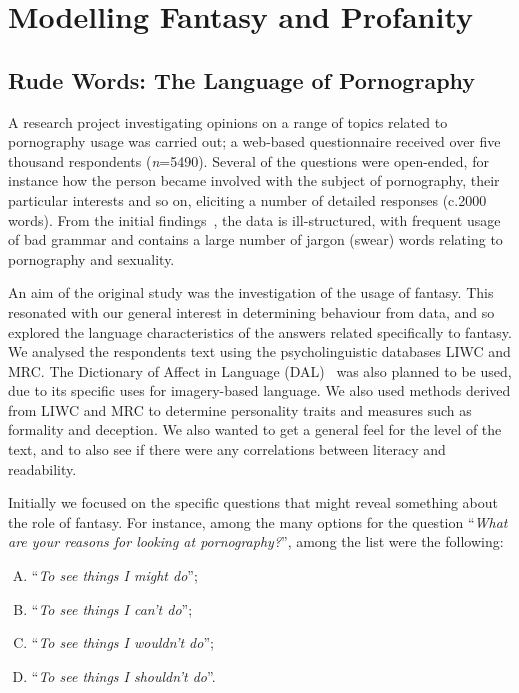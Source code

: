 \documentclass{AISB2008}
\begin{document}
\section{Modelling Fantasy and Profanity}

\subsection{Rude Words: The Language of Pornography}

A research project investigating opinions on a range of topics related
to pornography usage was carried out; a web-based questionnaire
received over five thousand respondents ({\emph{n}}=5490). Several of
the questions were open-ended, for instance how the person became
involved with the subject of pornography, their particular interests
and so on, eliciting a number of detailed responses (c.2000
words). From the initial findings~\cite{smith-et-al:2013}, the data is
ill-structured, with frequent usage of bad grammar and contains a
large number of jargon (swear) words relating to pornography and
sexuality.

An aim of the original study was the investigation of the usage of
fantasy. This resonated with our general interest in determining
behaviour from data, and so explored the language characteristics of
the answers related specifically to fantasy. We analysed the
respondents text using the psycholinguistic databases LIWC and
MRC. The Dictionary of Affect in Language
(DAL)~\cite{sweeney+whissell:1984} was also planned to be used, due to
its specific uses for imagery-based language. We also used methods
derived from LIWC and MRC to determine personality traits and measures
such as formality and deception. We also wanted to get a general feel
for the level of the text, and to also see if there were any
correlations between literacy and readability.

Initially we focused on the specific questions that might reveal
something about the role of fantasy. For instance, among the many
options for the question ``{\emph{What are your reasons for looking at
pornography?}}'', among the list were the following:

\begin{enumerate}[(A)]
\item ``{\emph{To see things I might do}}'';
\item ``{\emph{To see things I can't do}}'';
\item ``{\emph{To see things I wouldn't do}}'';
\item ``{\emph{To see things I shouldn't do}}''.
\end{enumerate}
\end{document}
